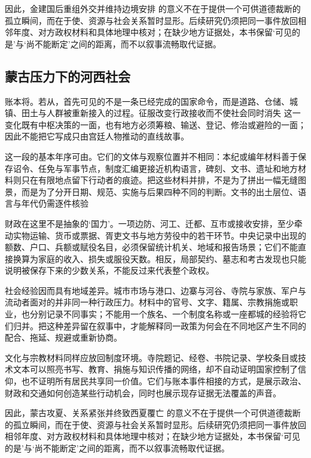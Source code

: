 因此，金建国后重组外交并维持边境安排 的意义不在于提供一个可供道德裁断的孤立瞬间，而在于使、资源与社会关系暂时显形。后续研究仍须把同一事件放回相邻年度、对方政权材料和具体地理中核对；在缺少地方证据处，本书保留‘可见的是’与‘尚不能断定’之间的距离，而不以叙事流畅取代证据。

\subsection{蒙古压力下的河西社会}

账本将。若从，首先可见的不是一条已经完成的国家命令，而是道路、仓储、城镇、田土与人群被重新接入的过程。征服改变行政接收而不使社会同时消失 这一变化既有中枢决策的一面，也有地方必须筹粮、输送、登记、修治或避险的一面；因此不能把它写成只由宫廷人物推动的直线故事。

这一段的基本年序可由。它们的文体与观察位置并不相同：本纪或编年材料善于保存诏令、任免与军事节点，制度汇编更接近机构语言，碑刻、文书、遗址和地方材料则只在有限地点留下行动者的痕迹。把这些材料并排，不是为了拼出一幅无缝图景，而是为了分开日期、规范、实施与后果四种不同的判断。文书的出土层位、语言与年代仍需逐件核验

财政在这里不是抽象的‘国力’。一项边防、河工、迁都、互市或接收安排，至少牵动实物运输、货币或票据、胥吏文书与地方劳役中的若干环节。中央记录中出现的额数、户口、兵额或赋役名目，必须保留统计机关、地域和报告场景；它们不能直接换算为家庭的收入、损失或服役天数。相反，局部契约、墓志和考古发现也只能说明被保存下来的少数关系，不能反过来代表整个政权。

社会经验因而具有地域差异。城市市场与港口、边寨与河谷、寺院与家族、军户与流动者面对的并非同一种行政压力。材料中的官号、文字、籍属、宗教捐施或职业，也分别记录不同事实；不能用一个族名、一个制度名称或一座都城的经验将它们归并。把这种差异留在叙事中，才能解释同一政策为何会在不同地区产生不同的配合、拖延、规避或重新协商。

文化与宗教材料同样应放回制度环境。寺院题记、经卷、书院记录、学校条目或技术文本可以照亮书写、教育、捐施与知识传播的网络，却不自动证明国家控制了信仰，也不证明所有居民共享同一价值。它们与账本事件相接的方式，是展示政治、财政和交通如何创造某些行动机会，同时也展示现存证据无法覆盖的声音。

因此，蒙古攻夏、关系紧张并终致西夏覆亡 的意义不在于提供一个可供道德裁断的孤立瞬间，而在于使、资源与社会关系暂时显形。后续研究仍须把同一事件放回相邻年度、对方政权材料和具体地理中核对；在缺少地方证据处，本书保留‘可见的是’与‘尚不能断定’之间的距离，而不以叙事流畅取代证据。

